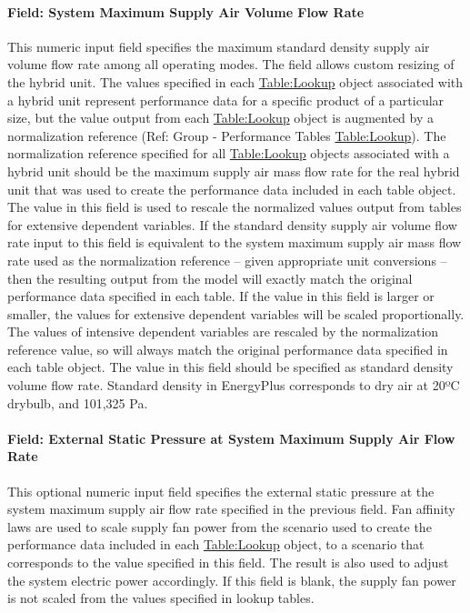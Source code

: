 \paragraph{Field: System Maximum Supply Air Volume Flow Rate}
This numeric input field specifies the maximum standard density supply air volume flow rate among all operating modes. The field allows custom resizing of the hybrid unit. The values specified in each \hyperref[tablelookup]{Table:Lookup} object associated with a hybrid unit represent performance data for a specific product of a particular size, but the value output from each \hyperref[tablelookup]{Table:Lookup} object is augmented by a normalization reference (Ref: Group - Performance Tables \hyperref[tablelookup]{Table:Lookup}). The normalization reference specified for all \hyperref[tablelookup]{Table:Lookup} objects associated with a hybrid unit should be the maximum supply air mass flow rate for the real hybrid unit that was used to create the performance data included in each table object. The value in this field is used to rescale the normalized values output from tables for extensive dependent variables. If the standard density supply air volume flow rate input to this field is equivalent to the system maximum supply air mass flow rate used as the normalization reference – given appropriate unit conversions – then the resulting output from the model will exactly match the original performance data specified in each table. If the value in this field is larger or smaller, the values for extensive dependent variables will be scaled proportionally. The values of intensive dependent variables are rescaled by the normalization reference value, so will always match the original performance data specified in each table object. The value in this field should be specified as standard density volume flow rate. Standard density in EnergyPlus corresponds to dry air at 20ºC drybulb, and 101,325 Pa.

\paragraph{Field: External Static Pressure at System Maximum Supply Air Flow Rate}
This optional numeric input field specifies the external static pressure at the system maximum supply air flow rate specified in the previous field. Fan affinity laws are used to scale supply fan power from the scenario used to create the performance data included in each \hyperref[tablelookup]{Table:Lookup} object, to a scenario that corresponds to the value specified in this field. The result is also used to adjust the system electric power accordingly. If this field is blank, the supply fan power is not scaled from the values specified in lookup tables.

